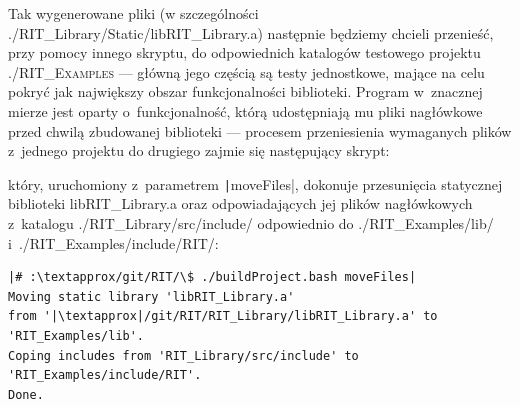 \small
\noindent{}

Tak wygenerowane pliki (w szczególności \textsf{./RIT\_Library/Static/libRIT\_Library.a}) następnie będziemy chcieli przenieść, przy pomocy innego skryptu, do odpowiednich katalogów testowego projektu \textsc{./RIT\_Examples} --- główną jego częścią są testy jednostkowe, mające na celu pokryć jak największy obszar funkcjonalności biblioteki. Program w~znacznej mierze jest oparty o~funkcjonalność, którą udostępniają mu pliki nagłówkowe przed chwilą zbudowanej biblioteki --- procesem przeniesienia wymaganych plików z~jednego projektu do drugiego zajmie się następujący skrypt:
	
który, uruchomiony z~parametrem \texttt|moveFiles|, dokonuje przesunięcia statycznej biblioteki \textsf{libRIT\_Library.a} oraz odpowiadających jej plików nagłówkowych z~katalogu \textsf{./RIT\_Library/src/include/} odpowiednio do \textsf{./RIT\_Examples/lib/} i~\textsf{./RIT\_Examples/include/RIT/}:

\begin{verbatim}
|# :\textapprox/git/RIT/\$ ./buildProject.bash moveFiles|
Moving static library 'libRIT_Library.a' 
from '|\textapprox|/git/RIT/RIT_Library/libRIT_Library.a' to 'RIT_Examples/lib'.
Coping includes from 'RIT_Library/src/include' to 'RIT_Examples/include/RIT'.
Done.
\end{verbatim}

